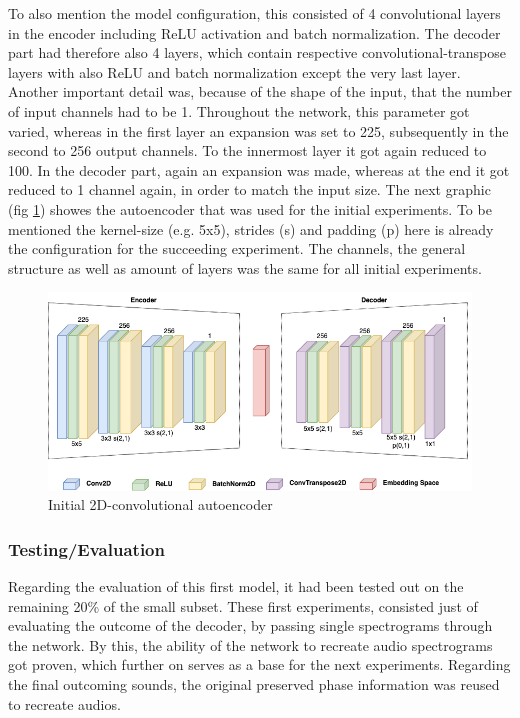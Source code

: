 To also mention the model configuration, this consisted of 4 convolutional layers in the encoder including ReLU activation and batch normalization. The decoder part had therefore also 4 layers, which contain respective convolutional-transpose layers with also ReLU and batch normalization except the very last layer. Another important detail was, because of the shape of the input, that the number of input channels had to be 1. Throughout the network, this parameter got varied, whereas in the first layer an expansion was set to 225, subsequently in the second to 256 output channels. To the innermost layer it got again reduced to 100. In the decoder part, again an expansion was made, whereas at the end it got reduced to 1 channel again, in order to match the input size. The next graphic (fig \ref{fig:cae_2D_init}) showes the autoencoder that was used for the initial experiments. To be mentioned the kernel-size (e.g. 5x5), strides (s) and padding (p) here is already the configuration for the succeeding experiment. The channels, the general structure as well as amount of layers was the same for all initial experiments.

 \begin{figure}[htb!]
	\caption{Initial 2D-convolutional autoencoder}
	\label{fig:cae_2D_init}
	\centering
	\includegraphics[width=\textwidth]{images/experiments/autoencoder_init.png}
\end{figure}

\subsubsection{Testing/Evaluation}
Regarding the evaluation of this first model, it had been tested out on the remaining 20\% of the small subset. These first experiments, consisted just of evaluating the outcome of the decoder, by passing single spectrograms through the network. By this, the ability of the network to recreate audio spectrograms got proven, which further on serves as a base for the next experiments. Regarding the final outcoming sounds, the original preserved phase information was reused to recreate audios.

